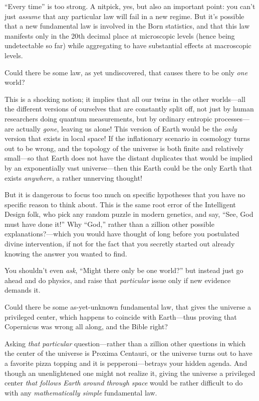 {
 ``Every time'' is too strong. A
nitpick, yes, but also an important point: you can't
just \textit{assume} that any particular law will fail in a new regime.
But it's possible that a new fundamental law is
involved in the Born statistics, and that this law manifests only in
the 20th decimal place at microscopic levels (hence being undetectable
so far) while aggregating to have substantial effects at macroscopic
levels.}

{
 Could there be some law, as yet undiscovered, that causes there to
be only \textit{one} world?}

{
 This is a shocking notion; it implies that all our twins in the
other worlds---all the different versions of ourselves that are
constantly split off, not just by human researchers doing quantum
measurements, but by ordinary entropic processes---are actually
\textit{gone}, leaving us alone! This version of Earth would be the
\textit{only} version that exists in local space! If the inflationary
scenario in cosmology turns out to be wrong, and the topology of the
universe is both finite and relatively small---so that Earth does not
have the distant duplicates that would be implied by an exponentially
vast universe---then this Earth could be the only Earth that exists
\textit{anywhere}, a rather unnerving thought!}

{
 But it is dangerous to focus too much on specific hypotheses that
you have no specific reason to think about. This is the same root error
of the Intelligent Design folk, who pick any random puzzle in modern
genetics, and say, ``See, God must have done
it!'' Why ``God,''
rather than a zillion other possible explanations?---which you would
have thought of long before you postulated divine intervention, if not
for the fact that you secretly started out already knowing the answer
you wanted to find.}

{
 You shouldn't even \textit{ask},
``Might there only be one world?''
but instead just go ahead and do physics, and raise that
\textit{particular} issue only if new evidence demands it.}

{
 Could there be some as-yet-unknown fundamental law, that gives the
universe a privileged center, which happens to coincide with
Earth---thus proving that Copernicus was wrong all along, and the Bible
right?}

{
 Asking \textit{that particular} question---rather than a zillion
other questions in which the center of the universe is Proxima
Centauri, or the universe turns out to have a favorite pizza topping
and it is pepperoni---betrays your hidden agenda. And though an
unenlightened one might not realize it, giving the universe a
privileged center \textit{that follows Earth around through space}
would be rather difficult to do with any \textit{mathematically simple}
fundamental law.}

